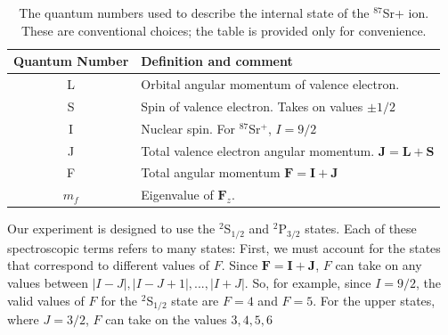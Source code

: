 \begin{table}[h!]
\centering
\begin{tabular}{|c|l|}
\hline
Quantum Number & Definition and comment \\ \hline \hline
L & Orbital angular momentum of valence electron. \\ \hline
S & Spin of valence electron. Takes on values $\pm 1/2$ \\ \hline
I & Nuclear spin. For $^{87}$Sr$^+$, $I=9/2$ \\ \hline
J & Total valence electron angular momentum. $\mathbf{J}=\mathbf{L}+\mathbf{S}$ \\ \hline
F & Total angular momentum $\mathbf{F}=\mathbf{I}+\mathbf{J}$ \\ \hline
$m_f$ & Eigenvalue of $\mathbf{F}_z$.\\ \hline
\end{tabular}
\caption{The quantum numbers used to describe the internal state of the $^{87}$Sr+ ion. These are conventional choices; the table is provided only for convenience.}
\label{quantumNumberQuickref}
\end{table}


Our experiment is designed to use the $^2$S$_{1/2}$ and $^2$P$_{3/2}$ states. Each of these spectroscopic terms refers to many states: First, we must account for the states that correspond to different values of $F$. Since $\mathbf{F}=\mathbf{I}+\mathbf{J}$, $F$ can take on any values between $|I-J|,|I-J+1|,...,|I+J|$. So, for example, since $I=9/2$, the valid values of $F$ for the $^2$S$_{1/2}$ state are $F=4$ and $F=5$. For the upper states, where $J=3/2$, $F$ can take on the values $3,4,5,6$ 

%


